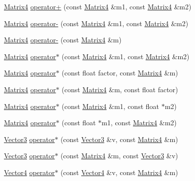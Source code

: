 \begin{DoxyCompactItemize}
\hyperlink{classprism_1_1_matrix4}{Matrix4} \hyperlink{namespaceprism_a33537d30f01f996f8a05fc5b1b49ba3b}{operator+} (const \hyperlink{classprism_1_1_matrix4}{Matrix4} \&m1, const \hyperlink{classprism_1_1_matrix4}{Matrix4} \&m2)
\item 
\hyperlink{classprism_1_1_matrix4}{Matrix4} \hyperlink{namespaceprism_a34a2f64f209065f753bed62a880b75b6}{operator-\/} (const \hyperlink{classprism_1_1_matrix4}{Matrix4} \&m1, const \hyperlink{classprism_1_1_matrix4}{Matrix4} \&m2)
\item 
\hyperlink{classprism_1_1_matrix4}{Matrix4} \hyperlink{namespaceprism_a879d3410d690b5722a9af17297f38fbb}{operator-\/} (const \hyperlink{classprism_1_1_matrix4}{Matrix4} \&m)
\item 
\hyperlink{classprism_1_1_matrix4}{Matrix4} \hyperlink{namespaceprism_a9ae44fb46bb709a5c8f4d592baf65522}{operator$\ast$} (const \hyperlink{classprism_1_1_matrix4}{Matrix4} \&m1, const \hyperlink{classprism_1_1_matrix4}{Matrix4} \&m2)
\item 
\hyperlink{classprism_1_1_matrix4}{Matrix4} \hyperlink{namespaceprism_ab3639f7bd46a54726522dfe406841ea9}{operator$\ast$} (const float factor, const \hyperlink{classprism_1_1_matrix4}{Matrix4} \&m)
\item 
\hyperlink{classprism_1_1_matrix4}{Matrix4} \hyperlink{namespaceprism_a4073983f089695c40b6fd20d892175f9}{operator$\ast$} (const \hyperlink{classprism_1_1_matrix4}{Matrix4} \&m, const float factor)
\item 
\hyperlink{classprism_1_1_matrix4}{Matrix4} \hyperlink{namespaceprism_aa2859acb8e8dd6fea8678e14249e561d}{operator$\ast$} (const \hyperlink{classprism_1_1_matrix4}{Matrix4} \&m1, const float $\ast$m2)
\item 
\hyperlink{classprism_1_1_matrix4}{Matrix4} \hyperlink{namespaceprism_a5e83bcd69595728106bed838aeb32f70}{operator$\ast$} (const float $\ast$m1, const \hyperlink{classprism_1_1_matrix4}{Matrix4} \&m2)
\item 
\hyperlink{classprism_1_1_vector3}{Vector3} \hyperlink{namespaceprism_a95ceb3342a808c88d0bb7c1f7e0ef82b}{operator$\ast$} (const \hyperlink{classprism_1_1_vector3}{Vector3} \&v, const \hyperlink{classprism_1_1_matrix4}{Matrix4} \&m)
\item 
\hyperlink{classprism_1_1_vector3}{Vector3} \hyperlink{namespaceprism_a04f1e6e0f84169fce23b236e0312d6a0}{operator$\ast$} (const \hyperlink{classprism_1_1_matrix4}{Matrix4} \&m, const \hyperlink{classprism_1_1_vector3}{Vector3} \&v)
\item 
\hyperlink{classprism_1_1_vector4}{Vector4} \hyperlink{namespaceprism_a5a10d8ea1e63b19d02bd294e4ebabb1b}{operator$\ast$} (const \hyperlink{classprism_1_1_vector4}{Vector4} \&v, const \hyperlink{classprism_1_1_matrix4}{Matrix4} \&m)

\end{DoxyCompactItemize}
